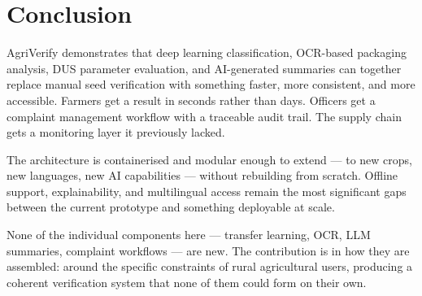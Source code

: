 \section{Conclusion}

AgriVerify demonstrates that deep learning classification, OCR-based packaging analysis, DUS parameter evaluation, and AI-generated summaries can together replace manual seed verification with something faster, more consistent, and more accessible. Farmers get a result in seconds rather than days. Officers get a complaint management workflow with a traceable audit trail. The supply chain gets a monitoring layer it previously lacked.

The architecture is containerised and modular enough to extend --- to new crops, new languages, new AI capabilities --- without rebuilding from scratch. Offline support, explainability, and multilingual access remain the most significant gaps between the current prototype and something deployable at scale.

None of the individual components here --- transfer learning, OCR, LLM summaries, complaint workflows --- are new. The contribution is in how they are assembled: around the specific constraints of rural agricultural users, producing a coherent verification system that none of them could form on their own.